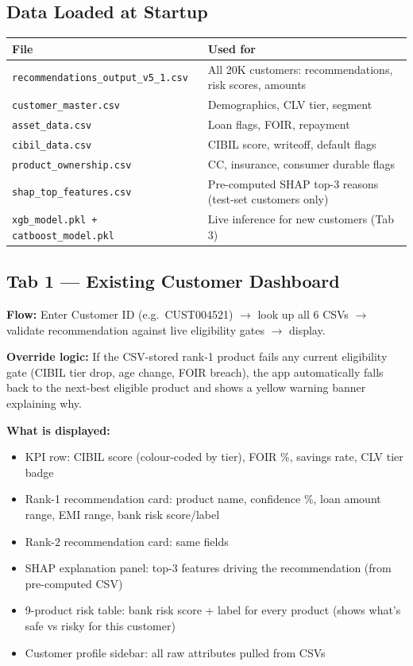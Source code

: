 \documentclass[12pt,a4paper]{article}
\begin{document}
\subsection{Data Loaded at Startup}

\begin{tabular}{ll}
\toprule
\textbf{File} & \textbf{Used for} \\
\midrule
\texttt{recommendations\_output\_v5\_1.csv} & All 20K customers: recommendations, risk scores, amounts \\
\texttt{customer\_master.csv}               & Demographics, CLV tier, segment \\
\texttt{asset\_data.csv}                   & Loan flags, FOIR, repayment \\
\texttt{cibil\_data.csv}                   & CIBIL score, writeoff, default flags \\
\texttt{product\_ownership.csv}             & CC, insurance, consumer durable flags \\
\texttt{shap\_top\_features.csv}            & Pre-computed SHAP top-3 reasons (test-set customers only) \\
\texttt{xgb\_model.pkl + catboost\_model.pkl} & Live inference for new customers (Tab 3) \\
\bottomrule
\end{tabular}

\subsection{Tab 1 — Existing Customer Dashboard}

\textbf{Flow:} Enter Customer ID (e.g.\ CUST004521) $\rightarrow$ look up all 6 CSVs $\rightarrow$ validate recommendation against live eligibility gates $\rightarrow$ display.

\textbf{Override logic:} If the CSV-stored rank-1 product fails any current eligibility gate (CIBIL tier drop, age change, FOIR breach), the app automatically falls back to the next-best eligible product and shows a yellow warning banner explaining why.

\textbf{What is displayed:}
\begin{itemize}[leftmargin=*,itemsep=2pt]
  \item KPI row: CIBIL score (colour-coded by tier), FOIR \%, savings rate, CLV tier badge
  \item Rank-1 recommendation card: product name, confidence \%, loan amount range, EMI range, bank risk score/label
  \item Rank-2 recommendation card: same fields
  \item SHAP explanation panel: top-3 features driving the recommendation (from pre-computed CSV)
  \item 9-product risk table: bank risk score + label for every product (shows what's safe vs risky for this customer)
  \item Customer profile sidebar: all raw attributes pulled from CSVs
\end{itemize}
\end{document}
